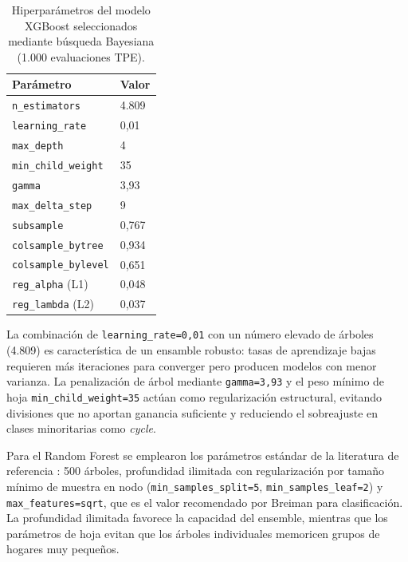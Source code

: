 \begin{table}[htbp]
  \caption{Hiperparámetros del modelo XGBoost seleccionados mediante búsqueda Bayesiana (1.000 evaluaciones TPE).}
  \label{tab:xgb_params}
  \centering
  \begin{tabular}{ll}
    \toprule
    \textbf{Parámetro} & \textbf{Valor} \\
    \midrule
    \texttt{n\_estimators}      & 4.809 \\
    \texttt{learning\_rate}     & 0,01 \\
    \texttt{max\_depth}         & 4 \\
    \texttt{min\_child\_weight} & 35 \\
    \texttt{gamma}              & 3,93 \\
    \texttt{max\_delta\_step}   & 9 \\
    \texttt{subsample}          & 0,767 \\
    \texttt{colsample\_bytree}  & 0,934 \\
    \texttt{colsample\_bylevel} & 0,651 \\
    \texttt{reg\_alpha} (L1)    & 0,048 \\
    \texttt{reg\_lambda} (L2)   & 0,037 \\
    \bottomrule
  \end{tabular}
\end{table}

La combinación de \texttt{learning\_rate=0,01} con un número elevado de árboles (4.809) es característica de un ensamble robusto: tasas de aprendizaje bajas requieren más iteraciones para converger pero producen modelos con menor varianza. La penalización de árbol mediante \texttt{gamma=3,93} y el peso mínimo de hoja \texttt{min\_child\_weight=35} actúan como regularización estructural, evitando divisiones que no aportan ganancia suficiente y reduciendo el sobreajuste en clases minoritarias como \textit{cycle}.

Para el Random Forest se emplearon los parámetros estándar de la literatura de referencia \cite{Breiman2001}: 500 árboles, profundidad ilimitada con regularización por tamaño mínimo de muestra en nodo (\texttt{min\_samples\_split=5}, \texttt{min\_samples\_leaf=2}) y \texttt{max\_features=sqrt}, que es el valor recomendado por Breiman para clasificación. La profundidad ilimitada favorece la capacidad del ensemble, mientras que los parámetros de hoja evitan que los árboles individuales memoricen grupos de hogares muy pequeños.

